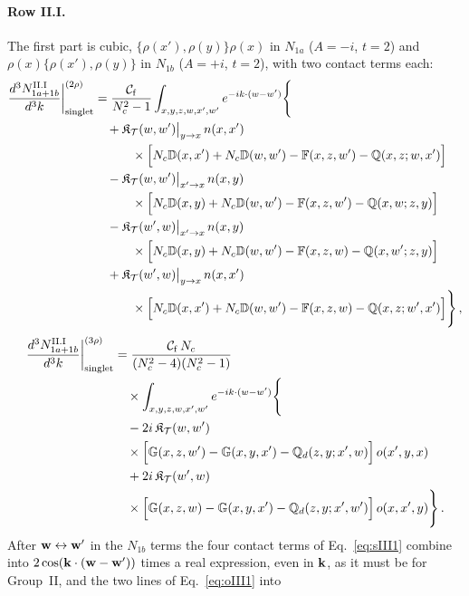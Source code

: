 \paragraph{Row II.I.} The first part is cubic, $\{\rho(x'),\rho(y)\}\rho(x)$ in $N_{1a}$ ($A=-i$, $t=2$) and $\rho(x)\{\rho(x'),\rho(y)\}$ in $N_{1b}$ ($A=+i$, $t=2$), with two contact terms each:
\begin{align}\label{eq:sIII1}
\frac{d^3N^{\rm II.I}_{1a+1b}}{d^3k}\bigg|^{(2\rho)}_{\rm singlet}&=\frac{\mathcal C_{\rm f}}{N_c^2-1}\int_{x,y,z,w,x',w'}e^{-ik\cdot(w-w')}\Bigg\{\notag\\
&\quad+\mathfrak K_{\mathcal T}(w,w')\big|_{y\to x}\,n(x,x')\notag\\
&\qquad\quad\times\Big[N_c\mathbb{D}(x,x')+N_c\mathbb{D}(w,w')-\mathbb{F}(x,z,w')-\mathbb{Q}(x,z;w,x')\Big]\notag\\
&\quad-\mathfrak K_{\mathcal T}(w,w')\big|_{x'\to x}\,n(x,y)\notag\\
&\qquad\quad\times\Big[N_c\mathbb{D}(x,y)+N_c\mathbb{D}(w,w')-\mathbb{F}(x,z,w')-\mathbb{Q}(x,w;z,y)\Big]\notag\\
&\quad-\mathfrak K_{\mathcal T}(w',w)\big|_{x'\to x}\,n(x,y)\notag\\
&\qquad\quad\times\Big[N_c\mathbb{D}(x,y)+N_c\mathbb{D}(w,w')-\mathbb{F}(x,z,w)-\mathbb{Q}(x,w';z,y)\Big]\notag\\
&\quad+\mathfrak K_{\mathcal T}(w',w)\big|_{y\to x}\,n(x,x')\notag\\
&\qquad\quad\times\Big[N_c\mathbb{D}(x,x')+N_c\mathbb{D}(w,w')-\mathbb{F}(x,z,w)-\mathbb{Q}(x,z;w',x')\Big]\Bigg\}\,,
\end{align}
\begin{align}\label{eq:oIII1}
\frac{d^3N^{\rm II.I}_{1a+1b}}{d^3k}\bigg|^{(3\rho)}_{\rm singlet}&=\frac{\mathcal C_{\rm f}\,N_c}{(N_c^2-4)(N_c^2-1)}\notag\\
&\quad\times\int_{x,y,z,w,x',w'}e^{-ik\cdot(w-w')}\Bigg\{\notag\\
&\quad-2i\,\mathfrak K_{\mathcal T}(w,w')\notag\\
&\quad\times\Big[\mathbb{G}(x,z,w')-\mathbb{G}(x,y,x')-\mathbb{Q}_d(z,y;x',w)\Big]\,o(x',y,x)\notag\\
&\quad+2i\,\mathfrak K_{\mathcal T}(w',w)\notag\\
&\quad\times\Big[\mathbb{G}(x,z,w)-\mathbb{G}(x,y,x')-\mathbb{Q}_d(z,y;x',w')\Big]\,o(x,x',y)\Bigg\}\,.
\end{align}
After $\mathbf{w}\leftrightarrow\mathbf{w}'$ in the $N_{1b}$ terms the four contact terms of Eq.~\eqref{eq:sIII1} combine into $2\cos(\mathbf{k}\cdot(\mathbf{w}-\mathbf{w}'))$ times a real expression, even in $\mathbf{k}$, as it must be for Group~II, and the two lines of Eq.~\eqref{eq:oIII1} into
